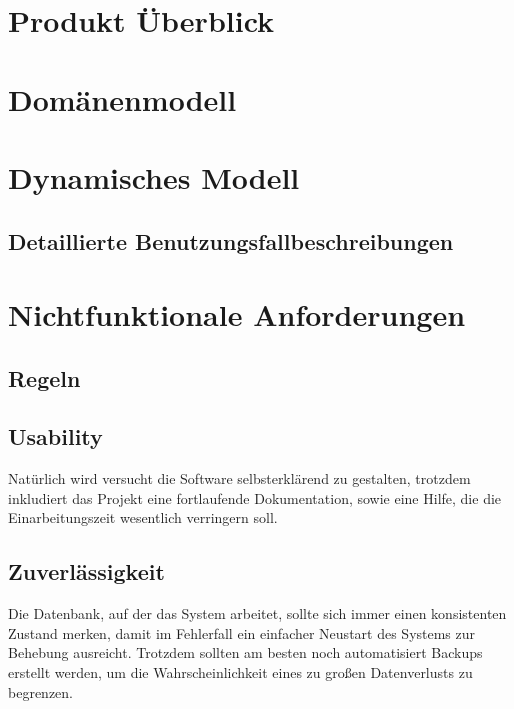\documentclass[10pt,a4paper,titlepage]{article}
\begin{document}
\newpage

\section{Produkt Überblick}

\newpage

\section{Domänenmodell}

\newpage

\section{Dynamisches Modell}
\subsection{Detaillierte Benutzungsfallbeschreibungen}












\newpage

\section{Nichtfunktionale Anforderungen}
\subsection{Regeln}
\subsection{Usability}
Natürlich wird versucht die Software selbsterklärend zu gestalten, trotzdem inkludiert das Projekt eine fortlaufende Dokumentation, sowie eine Hilfe, die die Einarbeitungszeit wesentlich verringern soll.
\subsection{Zuverlässigkeit}
Die Datenbank, auf der das System arbeitet, sollte sich immer einen konsistenten Zustand merken, damit im Fehlerfall ein einfacher Neustart des Systems zur Behebung ausreicht. Trotzdem sollten am besten noch automatisiert Backups erstellt werden, um die Wahrscheinlichkeit eines zu großen Datenverlusts zu begrenzen.
\end{document}
